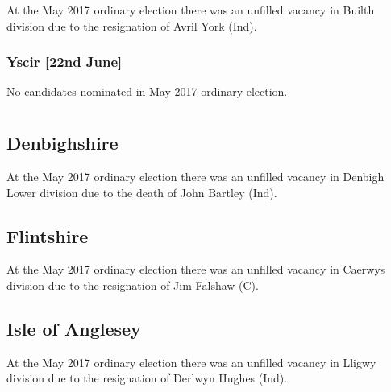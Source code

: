 \documentclass[a4paper,openany]{book}
\begin{document}
\begin{resultsiii}
At the May 2017 ordinary election there was an unfilled vacancy in Builth division due to the resignation of Avril York (Ind).

\subsubsection*{Yscir \hspace*{\fill}\nolinebreak[1]%
\enspace\hspace*{\fill}
[22nd June]}


No candidates nominated in May 2017 ordinary election.

\section[North Wales]{}

\subsection*{Denbighshire}

At the May 2017 ordinary election there was an unfilled vacancy in Denbigh Lower division due to the death of John Bartley (Ind).

\subsection*{Flintshire}

At the May 2017 ordinary election there was an unfilled vacancy in Caerwys division due to the resignation of Jim Falshaw (C).

\subsection*{Isle of Anglesey}

At the May 2017 ordinary election there was an unfilled vacancy in Lligwy division due to the resignation of Derlwyn Hughes (Ind).

\section[Aberdeen City and Shire]{}


\end{resultsiii}
\end{document}
